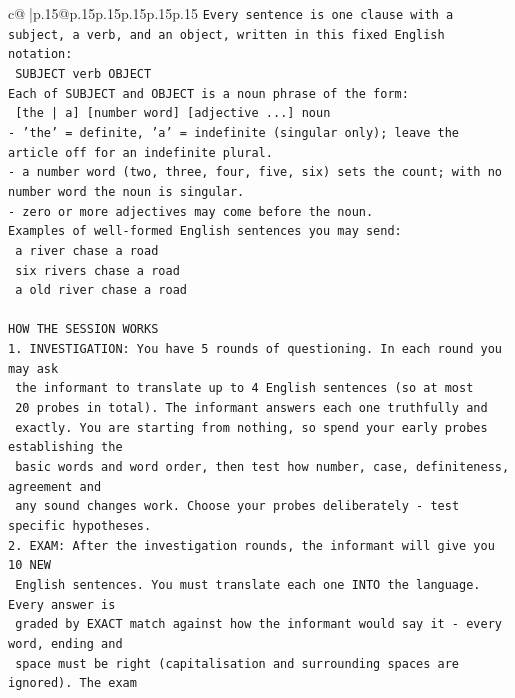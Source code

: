 \documentclass{article}
\begin{document}
{\begin{supertabular}{c@{$\;$}|p{.15\linewidth}@{}p{.15\linewidth}p{.15\linewidth}p{.15\linewidth}p{.15\linewidth}p{.15\linewidth}}
{{{\texttt{Every sentence is one clause with a subject, a verb, and an object, written in this fixed English notation:} \\
\texttt{    SUBJECT  verb  OBJECT} \\
\texttt{Each of SUBJECT and OBJECT is a noun phrase of the form:} \\
\texttt{    {[}the | a{]}  {[}number word{]}  {[}adjective ...{]}  noun} \\
\texttt{{-} 'the' = definite, 'a' = indefinite (singular only); leave the article off for an indefinite plural.} \\
\texttt{{-} a number word (two, three, four, five, six) sets the count; with no number word the noun is singular.} \\
\texttt{{-} zero or more adjectives may come before the noun.} \\
\texttt{Examples of well{-}formed English sentences you may send:} \\
\texttt{    a river chase a road} \\
\texttt{    six rivers chase a road} \\
\texttt{    a old river chase a road} \\
\\ 
\texttt{HOW THE SESSION WORKS} \\
\texttt{1. INVESTIGATION: You have 5 rounds of questioning. In each round you may ask} \\
\texttt{   the informant to translate up to 4 English sentences (so at most} \\
\texttt{   20 probes in total). The informant answers each one truthfully and} \\
\texttt{   exactly. You are starting from nothing, so spend your early probes establishing the} \\
\texttt{   basic words and word order, then test how number, case, definiteness, agreement and} \\
\texttt{   any sound changes work. Choose your probes deliberately {-} test specific hypotheses.} \\
\texttt{2. EXAM: After the investigation rounds, the informant will give you 10 NEW} \\
\texttt{   English sentences. You must translate each one INTO the language. Every answer is} \\
\texttt{   graded by EXACT match against how the informant would say it {-} every word, ending and} \\
\texttt{   space must be right (capitalisation and surrounding spaces are ignored). The exam} \\
}}}
\end{supertabular}}
\end{document}

